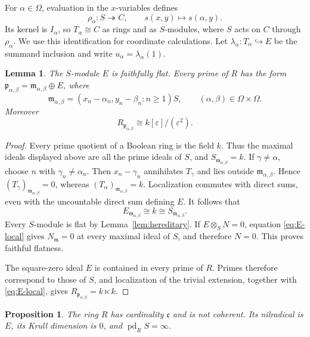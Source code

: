 \documentclass[11pt]{amsart}
\newtheorem{proposition}[theorem]{Proposition}
\newtheorem{lemma}[theorem]{Lemma}
\theoremstyle{definition}
\DeclareMathOperator{\pd}{pd}
\newcommand{\cc}{\mathfrak c}
\newcommand{\eps}{\varepsilon}
\newcommand{\into}{\hookrightarrow}
\newcommand{\onto}{\twoheadrightarrow}
\numberwithin{equation}{section}
\begin{document}
For $\alpha\in\Omega$, evaluation in the $x$-variables defines
\begin{equation}\label{eq:rho}
 \rho_\alpha:S\onto C,\qquad s(x,y)\longmapsto s(\alpha,y).
\end{equation}
Its kernel is $I_\alpha$, so $T_\alpha\cong C$ as rings and as
$S$-modules, where $S$ acts on $C$ through $\rho_\alpha$.
We use this identification for coordinate calculations.
Let $\lambda_\alpha:T_\alpha\into E$ be the summand inclusion and
write $u_\alpha=\lambda_\alpha(1)$.

\begin{lemma}\label{lem:local}
The $S$-module $E$ is faithfully flat. Every prime of $R$ has the form
$\mathfrak p_{\alpha,\beta}=\mathfrak m_{\alpha,\beta}\oplus E$, where
\[
 \mathfrak m_{\alpha,\beta}
   =(x_n-\alpha_n,y_n-\beta_n:n\geq1)S,
 \qquad(\alpha,\beta)\in\Omega\times\Omega.
\]
Moreover
\[
 R_{\mathfrak p_{\alpha,\beta}}\cong k[\eps]/(\eps^2).
\]
\end{lemma}

\begin{proof}
Every prime quotient of a Boolean ring is the field $k$. Thus the
maximal ideals displayed above are all the prime ideals of $S$, and
$S_{\mathfrak m_{\alpha,\beta}}=k$. If $\gamma\ne\alpha$, choose $n$
with $\gamma_n\ne\alpha_n$. Then $x_n-\gamma_n$ annihilates
$T_\gamma$ and lies outside $\mathfrak m_{\alpha,\beta}$. Hence
$(T_\gamma)_{\mathfrak m_{\alpha,\beta}}=0$, whereas
$(T_\alpha)_{\mathfrak m_{\alpha,\beta}}=k$.
Localization commutes with direct sums, even with the uncountable
direct sum defining $E$. It follows that
\begin{equation}\label{eq:E-local}
 E_{\mathfrak m_{\alpha,\beta}}\cong k
       \cong S_{\mathfrak m_{\alpha,\beta}}.
\end{equation}
Every $S$-module is flat by Lemma~\ref{lem:hereditary}. If
$E\otimes_S N=0$, equation \eqref{eq:E-local} gives $N_{\mathfrak m}=0$
at every maximal ideal of $S$, and therefore $N=0$. This proves
faithful flatness.

The square-zero ideal $E$ is contained in every prime of $R$.
Primes therefore correspond to those of $S$, and localization of
the trivial extension, together with \eqref{eq:E-local}, gives
$R_{\mathfrak p_{\alpha,\beta}}=k\ltimes k$.
\end{proof}

\begin{proposition}\label{prop:structure}
The ring $R$ has cardinality $\cc$ and is not coherent. Its nilradical
is $E$, its Krull dimension is $0$, and $\pd_R S=\infty$.
\end{proposition}
\end{document}
